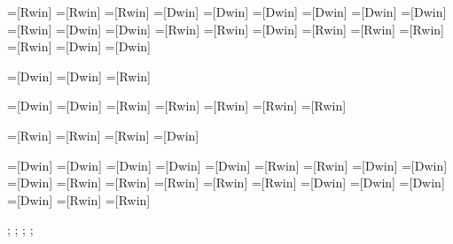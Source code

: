 

=[Rwin]	%
=[Rwin]	%
=[Rwin]	%
=[Dwin]	%
=[Dwin]	%
=[Dwin]	%
=[Dwin]	%
=[Dwin]	%
=[Dwin]	%
=[Rwin]	%
=[Dwin]	%
=[Dwin]	%
=[Rwin]	%
=[Rwin]	%
=[Dwin]	%
=[Rwin]	%
=[Rwin]	%
=[Rwin]	%
=[Rwin]	%
=[Dwin]	%
=[Dwin]	%

=[Dwin]	%
=[Dwin]	%
=[Rwin]	%

=[Dwin]	%
=[Dwin]	%
=[Rwin]	%
=[Rwin]	%
=[Rwin]	%
=[Rwin]	%
=[Rwin]	%

=[Rwin]	%
=[Rwin]	%
=[Rwin]	%
=[Dwin]	%

=[Dwin]	%
=[Dwin]	%
=[Dwin]	%
=[Dwin]	%
=[Dwin]	%
=[Rwin]	%
=[Rwin]	%
=[Dwin]	%
=[Dwin]	%
=[Dwin]	%
=[Rwin]	%
=[Rwin]	%
=[Rwin]	%
=[Rwin]	%
=[Rwin]	%
=[Dwin]	%
=[Dwin]	%
=[Dwin]	%
=[Dwin]	%
=[Rwin]	%
=[Rwin]	%



\def\Dfavcount{0};
\def\Dwincount{306};
\def\Rfavcount{0};
\def\Rwincount{232};
